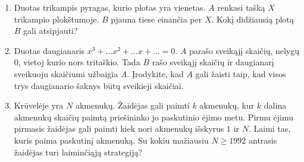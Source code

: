 \begin{enumerate}

\item Duotas trikampis pyragas, kurio plotas yra vienetas. $A$ renkasi tašką
  $X$ trikampio plokštumoje. $B$ pjauna tiese einančia per $X$. Kokį
  didžiausią plotą $B$ gali atsipjauti?


\item Duotas daugianaris $x^3+\dots x^2+\dots x+ \dots=0$. $A$ parašo
  sveikąjį skaičių, nelygų $0$, vietoj kurio nors tritaškio. Tada $B$ rašo
  sveikąjį skaičių ir daugianarį sveikuoju skaičiumi užbaigia $A$.
  Įrodykite, kad $A$ gali žaisti taip, kad visos trys daugianario šaknys būtų
  sveikieji skaičiai.


\item {} Krūvelėje yra $N$ akmenukų.
  Žaidėjas gali paimti $k$ akmenukų, kur $k$ dalina akmenukų skaičių paimtą
  priešininko jo paskutinio ėjimo metu. Pirmu ėjimu pirmasis žaidėjas gali
  paimti kiek nori akmenukų išskyrus $1$ ir $N$. Laimi tas, kuris paima
  paskutinį akmenuką. Su kokiu mažiausiu $N\geq 1992$ antrasis žaidėjas
  turi laiminčiąją strategiją?



\end{enumerate}
